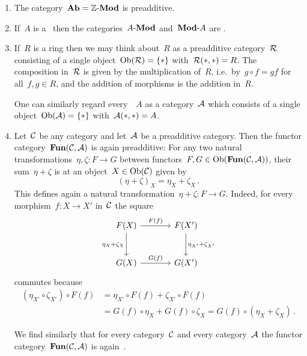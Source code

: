 \begin{example}
  \leavevmode
  \begin{enumerate}
    \item
      The category~$\mathbf{Ab} = \text{$\mathbb{Z}$-$\mathbf{Mod}$}$ is preadditive.
    \item
      If~$A$ is a~{\kalg} then the categories~$\text{$A$-$\mathbf{Mod}$}$ and~$\text{$\mathbf{Mod}$-$A$}$ are {\preklin}.
    \item
      If~$R$ is a ring then we may think about~$R$ as a preadditive category~$\mathcal{R}$ consisting of a single object~$\operatorname{Ob}(\mathcal{R}) = \{ \ast \}$ with~$\mathcal{R}(\ast,\ast) = R$.
      The composition in~$\mathcal{R}$ is given by the multiplication of~$R$, i.e.\ by~$g \circ f = gf$ for all~$f, g \in R$, and the addition of morphisms is the addition in~$R$.
      
      One can similarly regard every~{\kalg}~$A$ as a {\preklin} category~$\mathcal{A}$ which consists of a single object~$\operatorname{Ob}(\mathcal{A}) = \{\ast\}$ with~$\mathcal{A}(\ast,\ast) = A$.
    \item
      Let~$\mathcal{C}$ be any category and let~$\mathcal{A}$ be a preadditive category.
      Then the functor category~$\mathbf{Fun}(\mathcal{C}, \mathcal{A})$ is again preadditive:
      For any two natural transformations~$\eta, \zeta \colon F \to G$ between functors~$F, G \in \operatorname{Ob}(\mathbf{Fun}(\mathcal{C}, \mathcal{A}))$, their sum~$\eta + \zeta$ is at an object~$X \in \operatorname{Ob}(\mathcal{C})$ given by
      \[
          (\eta + \zeta)_X
        = \eta_X + \zeta_X \,.
      \]
      This defines again a natural transformation~$\eta + \zeta \colon F \to G$.
      Indeed, for every morphism~$f \colon X \to X'$ in~$\mathcal{C}$ the square
      \[
        \begin{tikzcd}[sep = large]
            F(X)
            \arrow{r}[above]{F(f)}
            \arrow{d}[left]{\eta_X + \zeta_X}
          & F(X')
            \arrow{d}[right]{\eta_{X'} + \zeta_{X'}}
          \\
            G(X)
            \arrow{r}[above]{G(f)}
          & G(X')
        \end{tikzcd}
      \]
      commutes because
      \begin{align*}
            (\eta_{X'} \circ \zeta_{X'}) \circ F(f)
        &=  \eta_{X'} \circ F(f) + \zeta_{X'} \circ F(f)  \\
        &=  G(f) \circ \eta_X + G(f) \circ \zeta_X
         =  G(f) \circ (\eta_X + \zeta_X) \,.
      \end{align*}
      
      We find similarly that for every category~$\mathcal{C}$ and every {\preklin} category~$\mathcal{A}$ the functor category~$\mathbf{Fun}(\mathcal{C}, \mathcal{A})$ is again~{\preklin}. 
  \end{enumerate}
\end{example}



